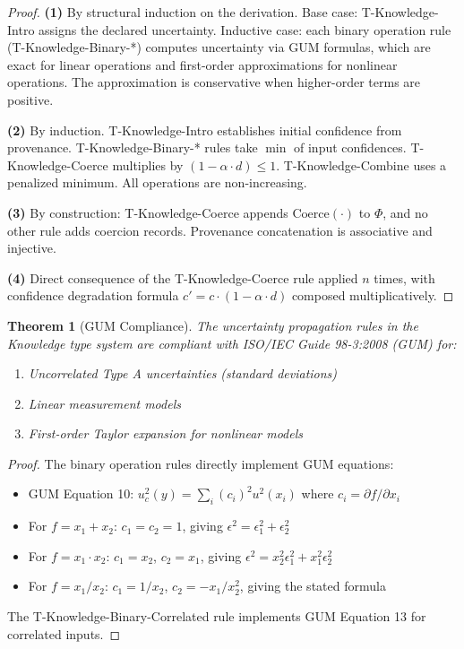 \documentclass{article}
\newtheorem{theorem}{Theorem}[section]
\begin{document}
\begin{proof}
\textbf{(1)} By structural induction on the derivation. Base case: T-Knowledge-Intro
assigns the declared uncertainty. Inductive case: each binary operation rule
(T-Knowledge-Binary-*) computes uncertainty via GUM formulas, which are exact
for linear operations and first-order approximations for nonlinear operations.
The approximation is conservative when higher-order terms are positive.

\textbf{(2)} By induction. T-Knowledge-Intro establishes initial confidence from
provenance. T-Knowledge-Binary-* rules take $\min$ of input confidences.
T-Knowledge-Coerce multiplies by $(1 - \alpha \cdot d) \leq 1$.
T-Knowledge-Combine uses a penalized minimum. All operations are non-increasing.

\textbf{(3)} By construction: T-Knowledge-Coerce appends $\text{Coerce}(\cdot)$
to $\Phi$, and no other rule adds coercion records. Provenance concatenation
is associative and injective.

\textbf{(4)} Direct consequence of the T-Knowledge-Coerce rule applied $n$ times,
with confidence degradation formula $c' = c \cdot (1 - \alpha \cdot d)$
composed multiplicatively.
\end{proof}

\begin{theorem}[GUM Compliance]
\label{thm:gum-compliance}
The uncertainty propagation rules in the Knowledge type system are compliant
with ISO/IEC Guide 98-3:2008 (GUM) for:
\begin{enumerate}
\item Uncorrelated Type A uncertainties (standard deviations)
\item Linear measurement models
\item First-order Taylor expansion for nonlinear models
\end{enumerate}
\end{theorem}

\begin{proof}
The binary operation rules directly implement GUM equations:
\begin{itemize}
\item GUM Equation 10: $u_c^2(y) = \sum_i (c_i)^2 u^2(x_i)$ where $c_i = \partial f / \partial x_i$
\item For $f = x_1 + x_2$: $c_1 = c_2 = 1$, giving $\epsilon^2 = \epsilon_1^2 + \epsilon_2^2$
\item For $f = x_1 \cdot x_2$: $c_1 = x_2$, $c_2 = x_1$, giving $\epsilon^2 = x_2^2\epsilon_1^2 + x_1^2\epsilon_2^2$
\item For $f = x_1 / x_2$: $c_1 = 1/x_2$, $c_2 = -x_1/x_2^2$, giving the stated formula
\end{itemize}
The T-Knowledge-Binary-Correlated rule implements GUM Equation 13 for correlated inputs.
\end{proof}
\end{document}
